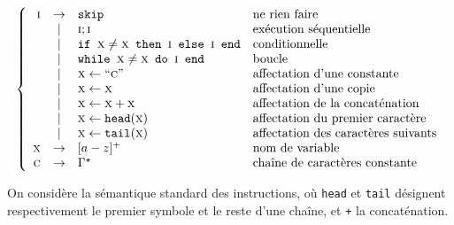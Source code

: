 \begin{exercice}
  $$\left\{\begin{array}{rcll}
  \textsc{i} & \rightarrow & \texttt{skip}                                                                                           & \text{ne rien faire}\\
  &                \mid        & \textsc{i} ; \textsc{i}                                                                             & \text{exécution séquentielle}\\
  &                \mid        & \texttt{if }\textsc{x}\neq\textsc{x}\texttt{ then }\textsc{i}\texttt{ else }\textsc{i}\texttt{ end} & \text{conditionnelle}\\
  &                \mid        & \texttt{while }\textsc{x}\neq\textsc{x}\texttt{ do }\textsc{i}\texttt{ end}                         & \text{boucle}\\
  &                \mid        & \textsc{x} \leftarrow `` \textsc{c} "                                                               & \text{affectation d'une constante}\\
  &                \mid        & \textsc{x} \leftarrow \textsc{x}                                                                    & \text{affectation d'une copie}\\
  &                \mid        & \textsc{x} \leftarrow \textsc{x} + \textsc{x}                                                       & \text{affectation de la concaténation}\\
  &                \mid        & \textsc{x} \leftarrow \texttt{head}(\textsc{x})                                                     & \text{affectation du premier caractère}\\
  &                \mid        & \textsc{x} \leftarrow \texttt{tail}(\textsc{x})                                                     & \text{affectation des caractères suivants}\\
  \textsc{x} & \rightarrow & [a-z]^+                                                                                                 & \text{nom de variable}\\
  \textsc{c} & \rightarrow & \Gamma^\star                                                                                             & \text{chaîne de caractères constante}\\
  \end{array}\right.$$
  
  On considère la sémantique standard des instructions, où \texttt{head} et \texttt{tail} désignent respectivement
  le premier symbole et le reste d'une chaîne, et \texttt{+} la concaténation.
  

\end{exercice}
